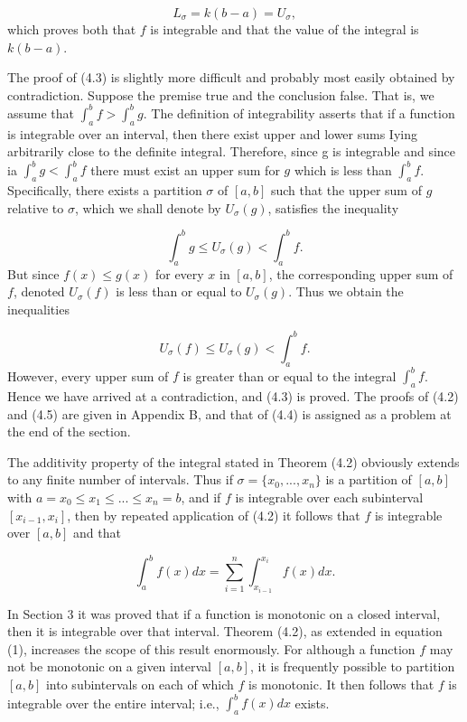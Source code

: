 $$
L_{\sigma} = k(b - a) = U_{\sigma},
$$
\noindent which proves both that $f$ is integrable and that the value of the integral is $k(b - a)$.

The proof of (4.3) is slightly more difficult and probably most easily obtained by contradiction. Suppose the premise true and the conclusion false. That is, we assume that $\int_{a}^{b} f > \int_{a}^{b} g$. The definition of integrability asserts that if a function is integrable over an interval, then there exist upper and lower sums Iying arbitrarily close to the definite integral. Therefore, since g is integrable and since ia $\int_{a}^{b} g < \int_{a}^{b} f$ there must exist an upper sum for $g$ which is less than $\int_{a}^{b} f$.  Specifically, there exists a partition $\sigma$ of $[a, b]$ such
that the upper sum of $g$ relative to $\sigma$, which we shall denote by $U_{\sigma}(g)$, satisfies the inequality 

$$
\int_{a}^{b} g \leq U_{\sigma}(g) < \int_{a}^{b} f.
$$
\noindent But since $f(x) \leq g(x)$ for every $x$ in $[a, b]$, the corresponding upper sum of $f$, denoted $U_{\sigma}(f)$ is less than or equal to $U_{\sigma}(g)$. Thus we obtain the inequalities 

$$
U_{\sigma}(f) \leq U_{\sigma}(g) < \int_{a}^{b} f.
$$
\noindent However, every upper sum of $f$ is greater than or equal to the integral $\int_{a}^{b} f$. Hence we have arrived at a contradiction, and (4.3) is proved. The proofs of (4.2) and (4.5) are given in Appendix B, and that of (4.4) is assigned as a problem at the end of the section.

The additivity property of the integral stated in Theorem (4.2) obviously extends to any finite number of intervals. Thus if $\sigma = \{ x_0, . . ., x_n \} $ is a partition of $[a, b]$ with $a = x_0 \leq x_1 \leq ... \leq x_{n} = b$, and if $f$ is integrable over each subinterval $[x_{i-1}, x_i]$, then by repeated application of (4.2) it follows that $f$ is integrable over $[a, b]$ and that

\begin{equation}
\int_{a}^{b} f(x) dx = \sum_{i = 1}^{n} \int_{x_{i-1}}^{x_{i}} f(x) dx.  
\label{eq4.4.1}
\end{equation}

In Section 3 it was proved that if a function is monotonic on a closed interval, then it is integrable over that interval. Theorem (4.2), as extended in equation (1), increases the scope of this result enormously. For although a function $f$ may not be monotonic on a given interval $[a, b]$, it is frequently possible to partition $[a, b]$ into subintervals on each of which $f$ is monotonic. It then follows that $f$ is integrable over the entire interval; i.e., $\int_{a}^{b} f(x) dx$ exists.

